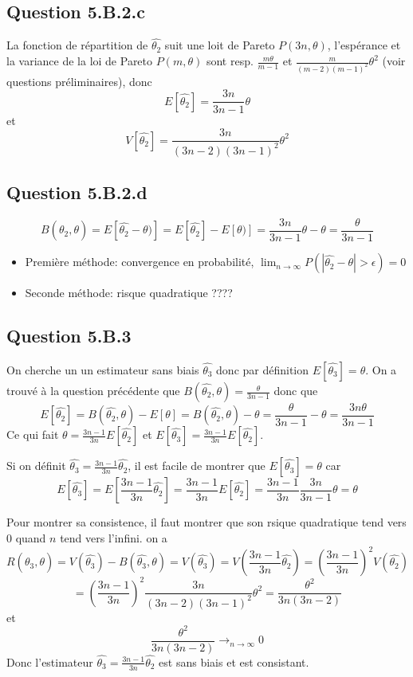 \documentclass[]{book}
\theoremstyle{definition}
\begin{document}
\subsection*{Question 5.B.2.c}
La fonction de r\'epartition de $\hat{\theta_2}$ suit une loit de Pareto $P(3n, \theta)$, l'esp\'erance et la variance de la loi de Pareto $P(m, \theta)$ sont resp. $\frac{m\theta}{m-1}$ et $\frac{m}{(m-2)(m-1)^2}\theta^2$ (voir questions pr\'eliminaires), donc
$$
E[\hat{\theta_2}] = \frac{3n}{3n-1}\theta
$$ 
et 
$$
V[\hat{\theta_2}] = \frac{3n}{(3n-2)(3n-1)^2}\theta^2
$$


\subsection*{Question 5.B.2.d}
$$
B(\hat{\theta_2},\theta) = E[\hat{\theta_2} - \theta)] = E[\hat{\theta_2}] - E[\theta)] = \frac{3n}{3n-1}\theta - \theta = \frac{\theta}{3n-1} 
$$

\begin{itemize}
    \item Premi\`ere m\'ethode: convergence en probabilit\'e, $\lim_{n \to \infty}P(|\hat{\theta_2}-\theta| > \epsilon) = 0$
    \item Seconde m\'ethode: risque quadratique ????
\end{itemize}


\subsection*{Question 5.B.3}
On cherche un un estimateur sans biais $\hat{\theta_3}$ donc par d\'efinition $E[\hat{\theta_3}] = \theta$. On a trouv\'e \`a la question pr\'ec\'edente que $B(\hat{\theta_2},\theta) = \frac{\theta}{3n-1}$ donc que 
$$
E[\hat{\theta_2}] = B(\hat{\theta_2},\theta) - E[\theta] = B(\hat{\theta_2},\theta) - \theta = \frac{\theta}{3n-1} - \theta = \frac{3n\theta}{3n-1}
$$
Ce qui fait $\theta = \frac{3n-1}{3n}E[\hat{\theta_2}]$ et $E[\hat{\theta_3}] = \frac{3n-1}{3n}E[\hat{\theta_2}]$.

Si on d\'efinit $\hat{\theta_3} = \frac{3n-1}{3n}\hat{\theta_2}$, il est facile de montrer que $E[\hat{\theta_3}] = \theta$ car 
$$
E[\hat{\theta_3}] = E\left[\frac{3n-1}{3n}\hat{\theta_2}\right] = \frac{3n-1}{3n}E[\hat{\theta_2}] = \frac{3n-1}{3n} \frac{3n}{3n-1} \theta = \theta
$$

Pour montrer sa consistence, il faut montrer que son rsique quadratique tend vers 0 quand $n$ tend vers l'infini. on a 
$$
R(\hat{\theta_3},\theta) = V(\hat{\theta_3}) - B(\hat{\theta_3},\theta) = V(\hat{\theta_3}) = V\left(\frac{3n-1}{3n}\hat{\theta_2}\right) = \left(\frac{3n-1}{3n}\right)^2V(\hat{\theta_2})
$$
$$
= \left(\frac{3n-1}{3n}\right)^2\frac{3n}{(3n-2)(3n-1)^2}\theta^2 = \frac{\theta^2}{3n(3n-2)}
$$
et
$$
\frac{\theta^2}{3n(3n-2)} \to_{n \to \infty} 0
$$
Donc l'estimateur $\hat{\theta_3} = \frac{3n-1}{3n}\hat{\theta_2}$ est sans biais et est consistant.
\end{document}
